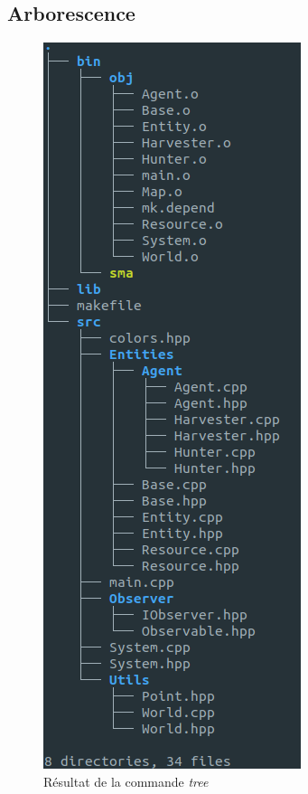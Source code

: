 \documentclass[a4paper, 12pt]{article}
\begin{document}
\subsection{Arborescence}
\begin{figure}[!h]
  \centering
  \caption{Résultat de la commande \emph{tree}}
  \includegraphics[scale=0.5]{img/tree.png}
\end{figure}
\end{document}
